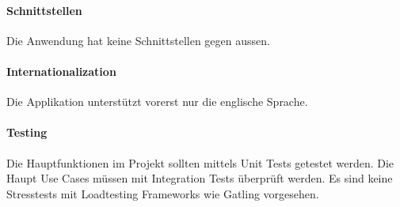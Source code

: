 \paragraph{Schnittstellen}
Die Anwendung hat keine Schnittstellen gegen aussen.

\paragraph{Internationalization}
Die Applikation unterstützt vorerst nur die englische Sprache.

\paragraph{Testing}
Die Hauptfunktionen im Projekt sollten mittels Unit Tests getestet werden. Die Haupt Use Cases müssen mit Integration Tests überprüft werden. Es sind keine Stresstests mit Loadtesting Frameworks wie Gatling vorgesehen.



